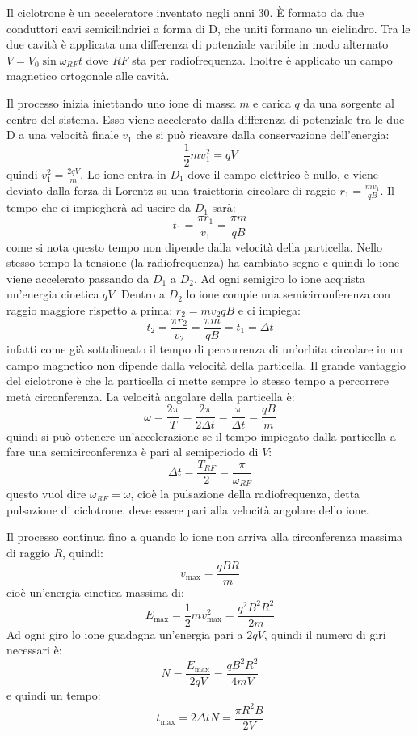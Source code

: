 \begin{Es}[Ciclotrone]
  Il ciclotrone  è un acceleratore inventato negli anni 30. È formato da due conduttori cavi semicilindrici a forma di D, che uniti formano un ciclindro. Tra le due cavità è applicata una differenza di potenziale varibile in modo alternato $V=V_0\sin\omega_{RF}t$ dove $RF$ sta per radiofrequenza. Inoltre è applicato un campo magnetico ortogonale alle cavità.

  Il processo inizia iniettando uno ione di massa $m$ e carica $q$ da una sorgente al centro del sistema. Esso viene accelerato dalla differenza di potenziale tra le due D a una velocità finale $v_1$ che si può ricavare dalla conservazione dell'energia:
  \[
    \frac{1}{2}mv_1^2 = qV
  \]
  quindi $v_1^2 = \frac{2qV}{m}$. Lo ione entra in $D_1$ dove il campo elettrico è nullo, e viene deviato dalla forza di Lorentz su una traiettoria circolare di raggio $r_1=\frac{m v_1}{qB}$. Il tempo che ci impiegherà ad uscire da $D_1$ sarà:
  \[
    t_1 = \frac{\pi r_1}{v_1}=\frac{\pi m}{qB}
  \]
  come si nota questo tempo non dipende dalla velocità della particella. Nello stesso tempo la tensione (la radiofrequenza) ha cambiato segno e quindi lo ione viene accelerato passando da $D_1$ a $D_2$. Ad ogni semigiro lo ione acquista un'energia cinetica $qV$. Dentro a $D_2$ lo ione compie una semicirconferenza con raggio maggiore rispetto a prima: $r_2={m v_2}{qB}$ e ci impiega:
  \[
    t_2 = \frac{\pi r_2}{v_2}=\frac{\pi m}{qB} = t_1 = \Delta t
  \]
  infatti come già sottolineato il tempo di percorrenza di un'orbita circolare in un campo magnetico non dipende dalla velocità della particella. Il grande vantaggio del ciclotrone è che la particella ci mette sempre lo stesso tempo a percorrere metà circonferenza. La velocità angolare della particella è:
  \[
    \omega = \frac{2\pi}{T} = \frac{2\pi}{2\Delta t} = \frac{\pi}{\Delta t} = \frac{qB}{m}
  \]
  quindi si può ottenere un'accelerazione se il tempo impiegato dalla particella a fare una semicirconferenza è pari al semiperiodo di $V$:
  \[
    \Delta t = \frac{T_{RF}}{2} = \frac{\pi}{\omega_{RF}}
  \]
  questo vuol dire $\omega_{RF}=\omega$, cioè la pulsazione della radiofrequenza, detta pulsazione di ciclotrone, deve essere pari alla velocità angolare dello ione.

  Il processo continua fino a quando lo ione non arriva alla circonferenza massima di raggio $R$, quindi:
  \[
    v_{\max} = \frac{qBR}{m}
  \]
  cioè un'energia cinetica massima di:
  \[
    E_{\max} = \frac{1}{2}mv_{\max}^2 = \frac{q^2 B^2 R^2}{2m}
  \]
  Ad ogni giro lo ione guadagna un'energia pari a $2qV$, quindi il numero di giri necessari è:
  \[
    N = \frac{E_{\max}}{2qV} = \frac{qB^2R^2}{4mV}
  \]
  e quindi un tempo:
  \[
    t_{\max} = 2\Delta tN = \frac{\pi R^2 B}{2V}
  \]


\end{Es}
